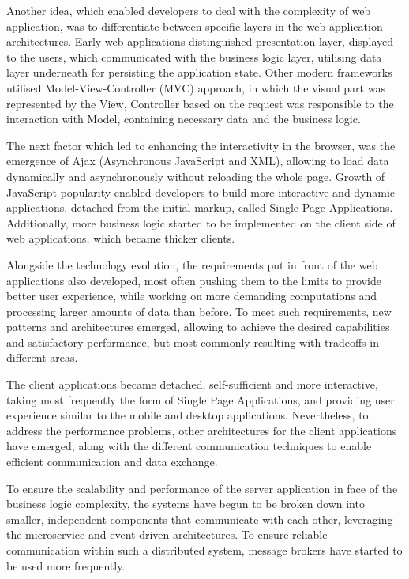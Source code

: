 Another idea, which enabled developers to deal with the complexity of web application, was to differentiate between specific layers in the web application architectures. Early web applications distinguished presentation layer, displayed to the users, which communicated with the business logic layer, utilising data layer underneath for persisting the application state. Other modern frameworks utilised Model-View-Controller (MVC) approach, in which the visual part was represented by the View, Controller based on the request was responsible to the interaction with Model, containing necessary data and the business logic.

The next factor which led to enhancing the interactivity in the browser, was the emergence of Ajax (Asynchronous JavaScript and XML), allowing to load data dynamically and asynchronously without reloading the whole page. Growth of JavaScript popularity enabled developers to build more interactive and dynamic applications, detached from the initial markup, called Single-Page Applications. Additionally, more business logic started to be implemented on the client side of web applications, which became thicker clients.

Alongside the technology evolution, the requirements put in front of the web applications also developed, most often pushing them to the limits to provide better user experience, while working on more demanding computations and processing larger amounts of data than before. To meet such requirements, new patterns and architectures emerged, allowing to achieve the desired capabilities and satisfactory performance, but most commonly resulting with tradeoffs in different areas.

The client applications became detached, self-sufficient and more interactive, taking most frequently the form of Single Page Applications, and providing user experience similar to the mobile and desktop applications. Nevertheless, to address the performance problems, other architectures for the client applications have emerged, along with the different communication techniques to enable efficient communication and data exchange.

To ensure the scalability and performance of the server application in face of the business logic complexity, the systems have begun to be broken down into smaller, independent components that communicate with each other, leveraging the microservice and event-driven architectures. To ensure reliable communication within such a distributed system, message brokers have started to be used more frequently.

